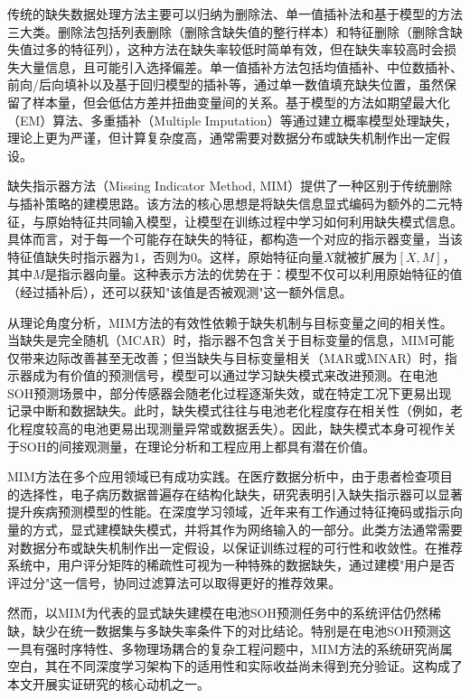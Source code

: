 \documentclass[10pt,a4paper]{ctexart}
\begin{document}
传统的缺失数据处理方法主要可以归纳为删除法、单一值插补法和基于模型的方法三大类。删除法包括列表删除（删除含缺失值的整行样本）和特征删除（删除含缺失值过多的特征列），这种方法在缺失率较低时简单有效，但在缺失率较高时会损失大量信息，且可能引入选择偏差。单一值插补方法包括均值插补、中位数插补、前向/后向填补以及基于回归模型的插补等，通过单一数值填充缺失位置，虽然保留了样本量，但会低估方差并扭曲变量间的关系。基于模型的方法如期望最大化（EM）算法、多重插补（Multiple Imputation）等通过建立概率模型处理缺失，理论上更为严谨，但计算复杂度高，通常需要对数据分布或缺失机制作出一定假设。

缺失指示器方法（Missing Indicator Method, MIM）提供了一种区别于传统删除与插补策略的建模思路\cite{jones1996indicator,van2023missing}。该方法的核心思想是将缺失信息显式编码为额外的二元特征，与原始特征共同输入模型，让模型在训练过程中学习如何利用缺失模式信息\cite{ipsen2022deal}。具体而言，对于每一个可能存在缺失的特征，都构造一个对应的指示器变量，当该特征值缺失时指示器为1，否则为0。这样，原始特征向量$X$就被扩展为$[X, M]$，其中$M$是指示器向量。这种表示方法的优势在于：模型不仅可以利用原始特征的值（经过插补后），还可以获知"该值是否被观测"这一额外信息。

从理论角度分析，MIM方法的有效性依赖于缺失机制与目标变量之间的相关性。当缺失是完全随机（MCAR）时，指示器不包含关于目标变量的信息，MIM可能仅带来边际改善甚至无改善；但当缺失与目标变量相关（MAR或MNAR）时，指示器成为有价值的预测信号，模型可以通过学习缺失模式来改进预测。在电池SOH预测场景中，部分传感器会随老化过程逐渐失效，或在特定工况下更易出现记录中断和数据缺失。此时，缺失模式往往与电池老化程度存在相关性（例如，老化程度较高的电池更易出现测量异常或数据丢失）。因此，缺失模式本身可视作关于SOH的间接观测量，在理论分析和工程应用上都具有潜在价值。

MIM方法在多个应用领域已有成功实践。在医疗数据分析中，由于患者检查项目的选择性，电子病历数据普遍存在结构化缺失，研究表明引入缺失指示器可以显著提升疾病预测模型的性能\cite{sisk2023imputation,ehrig2025imputation}。在深度学习领域，近年来有工作通过特征掩码或指示向量的方式，显式建模缺失模式，并将其作为网络输入的一部分\cite{ipsen2022deal,che2018recurrent}。此类方法通常需要对数据分布或缺失机制作出一定假设，以保证训练过程的可行性和收敛性。在推荐系统中，用户评分矩阵的稀疏性可视为一种特殊的数据缺失，通过建模"用户是否评过分"这一信号，协同过滤算法可以取得更好的推荐效果。

然而，以MIM为代表的显式缺失建模在电池SOH预测任务中的系统评估仍然稀缺，缺少在统一数据集与多缺失率条件下的对比结论。特别是在电池SOH预测这一具有强时序特性、多物理场耦合的复杂工程问题中，MIM方法的系统研究尚属空白，其在不同深度学习架构下的适用性和实际收益尚未得到充分验证。这构成了本文开展实证研究的核心动机之一。
\end{document}
